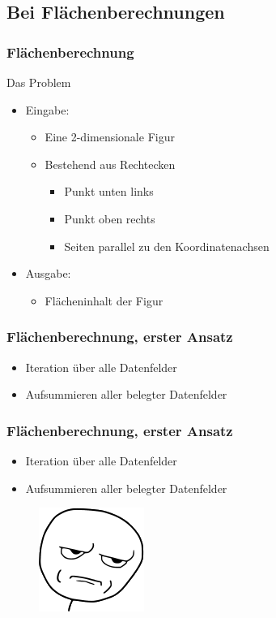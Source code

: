 \subsection{Bei Fl\"achenberechnungen}
\begin{frame}
	\frametitle{{Fl\"achenberechnung}}
	\begin{block}{Das Problem}
	\begin{itemize}
		\pause
		\item{Eingabe:}
		\pause
		\begin{itemize}
			\item Eine 2-dimensionale Figur
			\item Bestehend aus Rechtecken
			\begin{itemize}
				\item Punkt unten links
				\item Punkt oben rechts
				\item Seiten parallel zu den Koordinatenachsen
			\end{itemize}
		\end{itemize}
		\pause
		\item{Ausgabe:}
		\pause
		\begin{itemize}
			\item{Fl\"acheninhalt der Figur}
		\end{itemize}
	\end{itemize}
	\end{block}
\end{frame}
\begin{frame}
	\frametitle{{Fl\"achenberechnung, erster Ansatz}}
	\begin{itemize}
		\item Iteration \"uber alle Datenfelder
		\pause
		\item Aufsummieren aller belegter Datenfelder
	\end{itemize}
\end{frame}
\begin{frame}
	\frametitle{{Fl\"achenberechnung, erster Ansatz}}
	\begin{itemize}
		\item Iteration \"uber alle Datenfelder
		\item Aufsummieren aller belegter Datenfelder
	\end{itemize}
	\begin{figure}
		\begin{center}
			\includegraphics[scale=0.50]{bilder/kidding.png}		
		\end{center}
	\end{figure}
\end{frame}
